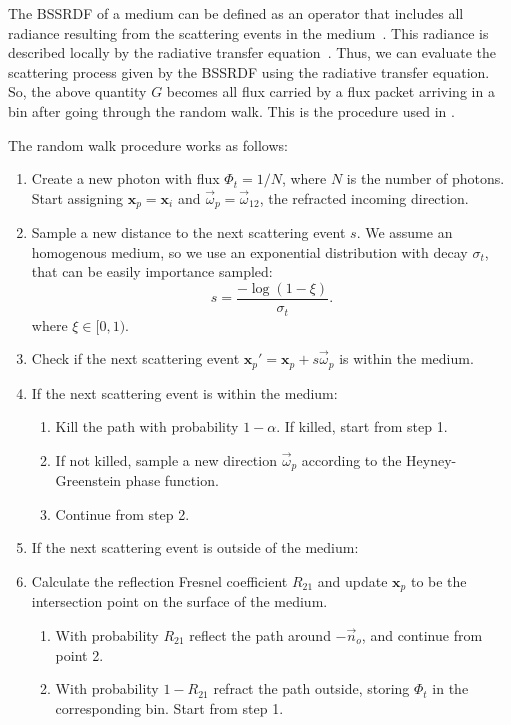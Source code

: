 \documentclass[10pt,a4paper]{article}
\newcommand{\x}{\mathbf{x}}
\newcommand{\vomega}{\vec{\omega}}
\begin{document}
The BSSRDF of a medium can be defined as an operator that includes all radiance resulting from the scattering events in the medium~\citep{preisendorfer65}. This radiance is described locally by the radiative transfer equation~\citep{preisendorfer65}. Thus, we can evaluate the scattering process given by the BSSRDF using the radiative transfer equation. So, the above quantity $G$ becomes all flux carried by a flux packet arriving in a bin after going through the random walk. This is the procedure used in \cite{wang1995}.

The random walk procedure works as follows:
\begin{enumerate}
\item Create a new photon with flux $\Phi_t = 1 / N$, where $N$ is the number of photons. Start assigning $\x_p = \x_i$ and $\vomega_p = \vomega_{12}$, the refracted incoming direction.
\item Sample a new distance to the next scattering event $s$. We assume an homogenous medium, so we use an exponential distribution with decay $\sigma_t$, that can be easily importance sampled:
$$
s = \frac{-\log(1 -\xi)}{\sigma_t}.
$$
where $\xi \in [0,1)$.

\item Check if the next scattering event $\x_p' = \x_p + s \vomega_p $ is within the medium.
\item If the next scattering event is within the medium:
\begin{enumerate}
\item Kill the path with probability $1-\alpha$. If killed, start from step 1.
\item If not killed, sample a new direction $\vomega_p$ according to the Heyney-Greenstein phase function. 
\item Continue from step 2.
\end{enumerate}
\item If the next scattering event is outside of the medium:
\item Calculate the reflection Fresnel coefficient $R_{21}$ and update $\x_p$ to be the intersection point on the surface of the medium.  
\begin{enumerate}
\item With probability $R_{21}$ reflect the path around $-\vec{n}_o$, and continue from point 2.
\item With probability $1 - R_{21}$ refract the path outside, storing $\Phi_t$ in the corresponding bin. Start from step 1.
\end{enumerate}
\end{enumerate}
\end{document}
